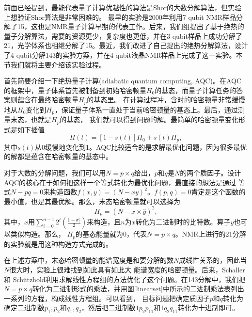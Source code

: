 前面已经提到，最能代表量子计算优越性的算法是Shor的大数分解算法\cite{Shor}，但实验上想验证Shor算法是非常困难的。
最早的实验是2000年利用7 qubit
NMR样品分解了15\cite{shor15}，这也是NMR量子计算早期的代表工作。后来，我们组提出了基于绝热的量子分解算法，需要的资源更少，复杂度也更低，并在3 qubit样品上成功分解了21\cite{shor21}，光学体系也相继分解了15\cite{optshor15}。最近，我们改进了自己提出的绝热分解算法，设计了4 qubit分解143的实验方案，并在4 qubit液晶NMR样品上完成了这一实验\cite{shor143}。本节我们就将主要介绍该实验过程。

首先简要介绍一下绝热量子计算(adiabatic quantum computing, AQC)\cite{aqc1}。在AQC的框架中，量子体系首先被制备到初始哈密顿量$H_0$的基态，而量子计算任务的答案则蕴含在最终哈密顿量$H_p$的基态里。
在计算过程冲，含时的哈密顿量非常缓慢地从$H_0$变化到$H_p$，保证量子体系一直处于当前哈密顿量的基态上。最后，通过测量末态，也就是$H_p$的基态，
我们就可以得到问题的解。最简单的哈密顿量变化形式是如下插值
\begin{equation}\label{aaa}
H(t) = [1-s(t)]H_0+s(t)H_p,
\end{equation}
其中$s(t)$从0缓慢地变化到1。AQC比较适合的是求解最优化问题，因为很多最优的解都是蕴含在哈密顿量的基态中。

对于大数的分解问题，我们可以用$N = p\times q$给出，$p$和$q$是$N$的两个质因子。设计AQC的核心在于如何把这样一个等式转化为最优化问题，最直接的想法是通过
等式$N - pq = 0$来构造函数$f(x,y) =(N - xy)^2$。$f(p,q)=0$肯定是这个函数的最小值，也是其最优解。那么，末态哈密顿量就可以选择为
\begin{equation}\label{interpo}
H_p = (N - \hat{x}\times\hat{y})^2,
\end{equation}
其中，$\hat{x}$用$\sum_{i = 0}^{n-1}2^i(\frac{1-\sigma_z^i}{2})$来构造，且$n$为$x$转化为二进制时的比特数。算子$\hat{y}$也可以类似构造。那么，
$H_p$的基态能量就为0，代表$N = p\times q$。NMR上进行的21分解的实验就是用这种构造方式完成的\cite{shor21}。

在上述方案中，末态哈密顿量的能谱宽度是和要分解的数$N$成线性关系的，因此当$N$很大时，实验上很难找到如此具有如此大
能谱宽度的哈密顿量。后来，Schaller和 Sch\"{u}tzhold\cite{aqc2,aqc3}利用求解线性方程组的方法优化了这个问题。在143分解中，我们把$N = p\times q$转化为二进制形式的乘法，并用图\ref{linearset}中所示的二进制乘法表列出一系列的方程，构成线性方程组。可以看到，
目标问题把确定质因子$p$和$q$转化为确定二进制数$p_1,p_2$和$q_1,q_2$，然后把二进制数$1p_2p_11$和$1q_2q_11$转化为十进制即可。

